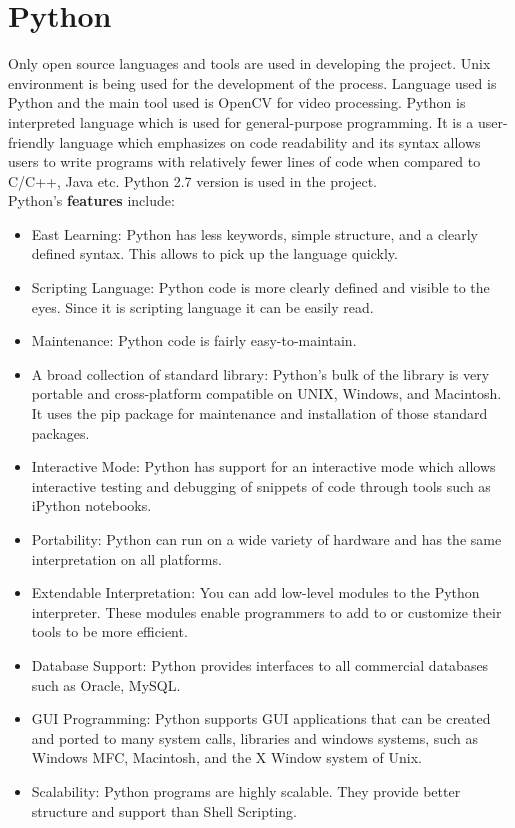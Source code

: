 \section{Python}
Only open source languages and tools are used in developing the project. Unix environment is being used for the development of the process.
Language used is Python and the main tool used is OpenCV for video processing. Python is interpreted language which is used for general-purpose programming. It is a user-friendly language which emphasizes on code readability and its syntax allows users to write programs with relatively fewer lines of code when compared to C/C++, Java etc. Python 2.7 version is used in the project.\\
Python's \textbf{features} include:
\begin{itemize}
\item East Learning: Python has less keywords, simple structure, and a clearly defined syntax. This allows to pick up the language quickly.
\item Scripting Language: Python code is more clearly defined and visible to the eyes. Since it is scripting language it can be easily read.
\item Maintenance: Python code is fairly easy-to-maintain.
\item A broad collection of standard library: Python's bulk of the library is very portable and cross-platform compatible on UNIX, Windows, and Macintosh. It uses the pip package for maintenance and installation of those standard packages.
\item Interactive Mode: Python has support for an interactive mode which allows interactive testing and debugging of snippets of code through tools such as iPython notebooks.
\item Portability: Python can run on a wide variety of hardware and has the same interpretation on all platforms.
\item Extendable Interpretation: You can add low-level modules to the Python interpreter. These modules enable programmers to add to or customize their tools to be more efficient.
\item Database Support: Python provides interfaces to all commercial databases such as Oracle, MySQL.
\item GUI Programming: Python supports GUI applications that can be created and ported to many system calls, libraries and windows systems, such as Windows MFC, Macintosh, and the X Window system of Unix.
\item Scalability: Python programs are highly scalable. They provide better structure and support than Shell Scripting.
\end{itemize}
